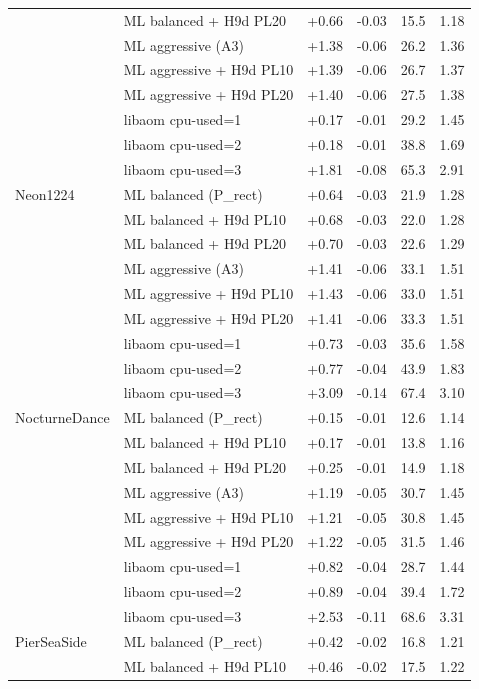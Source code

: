 \begin{table}[t]
\begin{tabular}{llrrrr}
 & ML balanced + H9d PL20 & +0.66 & -0.03 & 15.5 & 1.18 \\
 & ML aggressive (A3) & +1.38 & -0.06 & 26.2 & 1.36 \\
 & ML aggressive + H9d PL10 & +1.39 & -0.06 & 26.7 & 1.37 \\
 & ML aggressive + H9d PL20 & +1.40 & -0.06 & 27.5 & 1.38 \\
 & libaom cpu-used=1 & +0.17 & -0.01 & 29.2 & 1.45 \\
 & libaom cpu-used=2 & +0.18 & -0.01 & 38.8 & 1.69 \\
 & libaom cpu-used=3 & +1.81 & -0.08 & 65.3 & 2.91 \\
\midrule
Neon1224 & ML balanced (P\_rect) & +0.64 & -0.03 & 21.9 & 1.28 \\
 & ML balanced + H9d PL10 & +0.68 & -0.03 & 22.0 & 1.28 \\
 & ML balanced + H9d PL20 & +0.70 & -0.03 & 22.6 & 1.29 \\
 & ML aggressive (A3) & +1.41 & -0.06 & 33.1 & 1.51 \\
 & ML aggressive + H9d PL10 & +1.43 & -0.06 & 33.0 & 1.51 \\
 & ML aggressive + H9d PL20 & +1.41 & -0.06 & 33.3 & 1.51 \\
 & libaom cpu-used=1 & +0.73 & -0.03 & 35.6 & 1.58 \\
 & libaom cpu-used=2 & +0.77 & -0.04 & 43.9 & 1.83 \\
 & libaom cpu-used=3 & +3.09 & -0.14 & 67.4 & 3.10 \\
\midrule
NocturneDance & ML balanced (P\_rect) & +0.15 & -0.01 & 12.6 & 1.14 \\
 & ML balanced + H9d PL10 & +0.17 & -0.01 & 13.8 & 1.16 \\
 & ML balanced + H9d PL20 & +0.25 & -0.01 & 14.9 & 1.18 \\
 & ML aggressive (A3) & +1.19 & -0.05 & 30.7 & 1.45 \\
 & ML aggressive + H9d PL10 & +1.21 & -0.05 & 30.8 & 1.45 \\
 & ML aggressive + H9d PL20 & +1.22 & -0.05 & 31.5 & 1.46 \\
 & libaom cpu-used=1 & +0.82 & -0.04 & 28.7 & 1.44 \\
 & libaom cpu-used=2 & +0.89 & -0.04 & 39.4 & 1.72 \\
 & libaom cpu-used=3 & +2.53 & -0.11 & 68.6 & 3.31 \\
\midrule
PierSeaSide & ML balanced (P\_rect) & +0.42 & -0.02 & 16.8 & 1.21 \\
 & ML balanced + H9d PL10 & +0.46 & -0.02 & 17.5 & 1.22 \\

\end{tabular}
\end{table}
